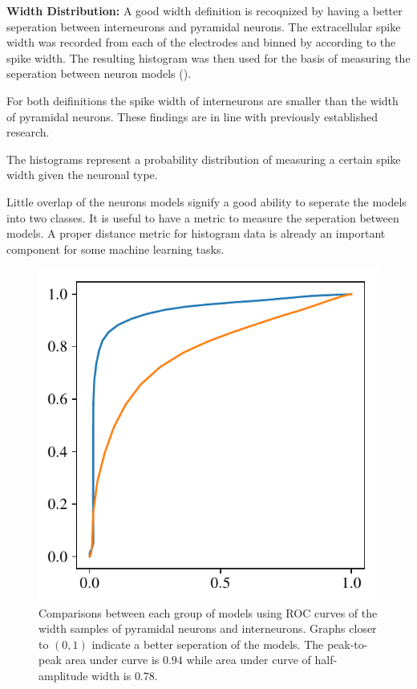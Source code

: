 \documentclass[altfont, fleqn]{uiophd}
\renewcommand{\cref}[1]{{\color{viridis_03}\mycref{#1}}}
\begin{document}
\noindent
\textbf{Width Distribution:}
A good width definition is recoqnized by having a better
seperation between interneurons
and pyramidal neurons. 
The extracellular spike width was recorded from each of the
electrodes and binned by according to the spike width.
The resulting histogram was then used for the basis
of measuring the seperation between neuron models 
(\cref{fig:4_width_I_II_histograms}).

For both deifinitions the spike width of interneurons are smaller
than the width of pyramidal neurons. 
These findings are in line with previously established research.

The histograms represent a probability distribution of
measuring a certain spike width given the neuronal type. 

Little overlap of the neurons models signify
a good ability to seperate the models into two classes. 
It is useful to have a metric to measure the seperation 
between models.
A proper distance metric for histogram data is already 
an important component for some machine learning tasks. 

\begin{figure}
    \vspace{-20pt}
    \begin{center}
        \includegraphics[width=\linewidth]{images/sec_4/roc_curves.pdf}
        \vspace{-20pt}
        \caption{%
            Comparisons between each group of models using ROC curves
            of the width samples of pyramidal neurons and interneurons. 
            Graphs closer to $(0,1)$ indicate a better seperation
            of the models. 
            The peak-to-peak area under curve is $0.94$ while
            area under curve of half-amplitude width is $0.78$.
            }
        \label{fig:4_roc_curves}
        \vspace{-10pt}
    \end{center}
\end{figure}
\end{document}
